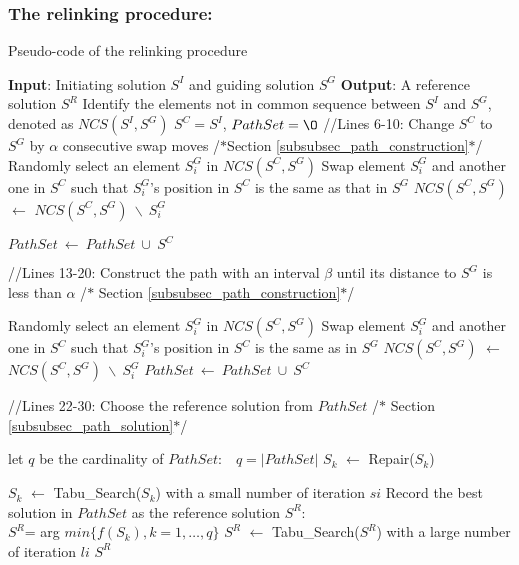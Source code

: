 \documentclass[authoryear,12pt]{elsarticle}
\begin{document}
\subsubsection{The relinking procedure:}
\label{subsubsec relinking}
\begin{algorithm}[!h]
\begin{scriptsize}
 \caption{Pseudo-code of the relinking procedure}\label{algorithm_PR}
 \begin{algorithmic}[1]
   \STATE \sf \textbf{Input}: Initiating solution $S^{I}$ and guiding solution $S^{G}$
   \STATE \textbf{Output}: A reference solution $S^{R}$
   \STATE  Identify the elements not in common sequence between $S^{I}$ and $S^{G}$, denoted as $NCS(S^{I},S^{G})$
   \STATE $S^{C}=S^I$, $PathSet={\O}$
   \STATE //Lines 6-10: Change $S^{C}$ to $S^G$ by $\alpha$ consecutive swap moves /$\ast$Section \ref{subsubsec_path_construction}$\ast$/
       \STATE  Randomly select an element $S^{G}_{i}$  in $NCS(S^{C},S^{G})$
       \STATE  Swap element $S^{G}_i$ and another one in $S^{C}$ such that $S^{G}_i$'s position in $S^{C}$ is the same as that in $S^{G}$
        \STATE $NCS(S^{C},S^{G})$   $\leftarrow$ $ NCS(S^{C},S^{G}) \ \backslash \ S^{G}_i $
   \ENDFOR

   \STATE $PathSet\ \leftarrow\ PathSet\ \cup\ S^C$

   \STATE //Lines 13-20: Construct the path with an interval $\beta$ until its distance to $S^{G}$ is less than $\alpha$  /$\ast$ Section \ref{subsubsec_path_construction}$\ast$/

       \STATE  Randomly select an element $S_{i}^{G}$ in $NCS(S^{C},S^{G})$
       \STATE  Swap element $S^{G}_i$ and another one in $S^{C}$ such that $S^{G}_i$'s position in $S^{C}$ is the same as in $S^{G}$
       \STATE $NCS(S^{C},S^{G})$   $\leftarrow$ $ NCS(S^{C},S^{G}) \ \backslash \ S^{G}_i $
       \ENDFOR
       \STATE $PathSet\ \leftarrow\ PathSet\ \cup\ S^C$
   \ENDWHILE

   \STATE //Lines 22-30: Choose the reference solution from $PathSet$ \hfill  /$\ast$ Section \ref{subsubsec_path_solution}$\ast$/

   \STATE let $q$ be the cardinality of $PathSet$:\ \ $q = |PathSet|$
           \STATE  $S_{k}$ $\leftarrow$  Repair($S_k$)
        \ENDIF

       \STATE $S_{k}$ $\leftarrow$ Tabu\_Search($S_{k}$) with a small number of iteration $si$
   \ENDFOR
   \STATE Record the best solution in $PathSet$ as the reference solution $S^{R}$:\\
          $S^{R}$= arg $min \{f(S_{k}), k=1,\ldots,q\}$
   \STATE $S^{R}$ $\leftarrow$ Tabu\_Search($S^{R}$) with a large number of iteration $li$
   \RETURN $S^{R}$
 \end{algorithmic}
 \end{scriptsize}
\end{algorithm}
\end{document}
